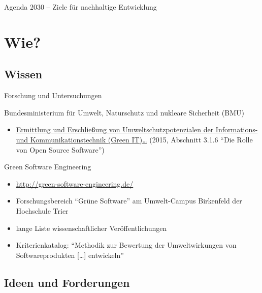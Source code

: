 \documentclass[t]{beamer}
\begin{document}
\begin{frame}{Agenda 2030 -- Ziele für nachhaltige Entwicklung}
\end{frame}

\section{Wie?}

\subsection{Wissen}

\begin{frame}{Forschung und Untersuchungen}
    \begin{block}{Bundesministerium für Umwelt, Naturschutz und nukleare Sicherheit (BMU)}
        \begin{itemize}
            \item \href{https://www.bmu.de/themen/forschung-foerderung/forschung/forschungs-und-entwicklungsberichte/details/ermittlung-und-erschliessung-von-umweltschutzpotenzialen-der-informations-und-kommunikationstechnik/}{Ermittlung und Erschließung von Umweltschutzpotenzialen der Informations- und Kommunikationstechnik (Green IT)…} (2015, Abschnitt 3.1.6 \enquote{Die Rolle von Open Source Software})
        \end{itemize}
    \end{block}
    \begin{block}{Green Software Engineering}
        \begin{itemize}
            \item \url{http://green-software-engineering.de/}
            \item Forschungsbereich \enquote{Grüne Software} am Umwelt-Campus Birkenfeld der Hochschule Trier
            \item lange Liste wissenschaftlicher Veröffentlichungen
            \item Kriterienkatalog: \enquote{Methodik zur Bewertung der
                Umweltwirkungen von Softwareprodukten […] entwickeln}
        \end{itemize}
    \end{block}
\end{frame}

\subsection{Ideen und Forderungen}
\end{document}
